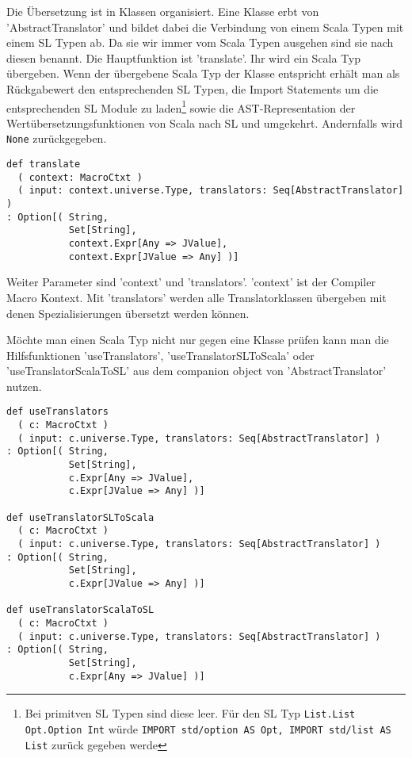 \documentclass[12pt,a4paper]{report}
\begin{document}
Die Übersetzung ist in Klassen organisiert. Eine Klasse erbt von 'AbstractTranslator' und bildet dabei die Verbindung von einem Scala Typen mit einem \ac{SL} Typen ab. Da sie wir immer vom Scala Typen ausgehen sind sie nach diesen benannt. Die Hauptfunktion ist 'translate'. Ihr wird ein Scala Typ übergeben. Wenn der übergebene Scala Typ der Klasse entspricht erhält man als Rückgabewert den entsprechenden \ac{SL} Typen, die Import Statements um die entsprechenden \ac{SL} Module zu laden\footnote{Bei primitven \ac{SL} Typen sind diese leer. Für den \ac{SL} Typ \lstinline!List.List Opt.Option Int! würde \lstinline!IMPORT std/option AS Opt, IMPORT std/list AS List! zurück gegeben werde} sowie die \ac{AST}-Representation der Wertübersetzungsfunktionen von Scala nach \ac{SL} und umgekehrt. Andernfalls wird \lstinline!None! zurückgegeben.

\begin{lstlisting}[caption=Hauptfunktion in AbstractTranslator, label=lst:bsp2]
def translate
  ( context: MacroCtxt )
  ( input: context.universe.Type, translators: Seq[AbstractTranslator] )
: Option[( String, 
           Set[String], 
           context.Expr[Any => JValue], 
           context.Expr[JValue => Any] )]
\end{lstlisting}

Weiter Parameter sind 'context' und 'translators'. 'context' ist der Compiler Macro Kontext. Mit 'translators' werden alle Translatorklassen übergeben mit denen Spezialisierungen übersetzt werden können.

Möchte man einen Scala Typ nicht nur gegen eine Klasse prüfen kann man die Hilfsfunktionen 'useTranslators', 'useTranslatorSLToScala' oder 'useTranslatorScalaToSL' aus dem companion object von 'AbstractTranslator' nutzen.

\begin{lstlisting}[caption=Hilfsfunktionen, label=lst:bsp1]
def useTranslators
  ( c: MacroCtxt )
  ( input: c.universe.Type, translators: Seq[AbstractTranslator] )
: Option[( String,
           Set[String], 
           c.Expr[Any => JValue], 
           c.Expr[JValue => Any] )]

def useTranslatorSLToScala
  ( c: MacroCtxt )
  ( input: c.universe.Type, translators: Seq[AbstractTranslator] )
: Option[( String, 
           Set[String], 
           c.Expr[JValue => Any] )]

def useTranslatorScalaToSL
  ( c: MacroCtxt )
  ( input: c.universe.Type, translators: Seq[AbstractTranslator] )
: Option[( String, 
           Set[String], 
           c.Expr[Any => JValue] )]
\end{lstlisting}
\end{document}
